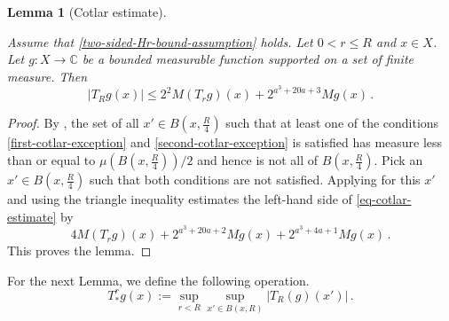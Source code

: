 \documentclass[10pt,a4paper]{article}
\theoremstyle{plain}
\newtheorem{lemma}[theorem]{Lemma}
\theoremstyle{definition}
\numberwithin{equation}{subsection}
\newcommand{\lean}[1]{}
\newcommand{\uses}[1]{}
\newcommand{\leanok}{}
\def\C{\mathbb{C}}
\begin{document}
\begin{lemma}[Cotlar estimate]
\label{Cotlar-estimate}
\leanok
\lean{cotlar_estimate}
\uses{Cotlar-control, Cotlar-sets}
Assume that \eqref{two-sided-Hr-bound-assumption} holds.
Let $0<r\le R$ and  $x\in X$. Let $g:X\to\C$ be a bounded measurable function supported on a set of finite measure. Then
\begin{equation}\label{eq-cotlar-estimate}
|T_Rg(x)| \le 2^{2}M(T_rg)(x)+ 2^{a^3+20a+3} Mg(x)
\, .
\end{equation}
\end{lemma}


\begin{proof}
\leanok
By , the set of all $x'\in B(x,\frac {R} 4)$
such that at least one of the conditions
\eqref{first-cotlar-exception} and
\eqref{second-cotlar-exception} is satisfied has measure less than or equal to $\mu(B(x,\frac{R}{4}))/2$ and hence is not all of $B(x,\frac {R} 4)$.
Pick an $x'\in B(x,\frac {R} 4)$ such that both conditions are not satisfied.
Applying  for this $x'$ and using the triangle inequality
estimates the left-hand side of \eqref{eq-cotlar-estimate}
by
\begin{equation}
    4 M(T_rg)(x) + 2^{a^3 + 20a + 2} Mg(x) + 2^{a^3 + 4a + 1} Mg(x)\, .
\end{equation}
This proves the lemma.
\end{proof}

For the next Lemma, we define the following operation.
\begin{equation}\label{eq-simple--nontangential}
    T_{*}^r g(x):=\sup_{r<R}\sup_{x'\in B(x,R)} |T_R(g)(x')| \, .
\end{equation}
\end{document}
